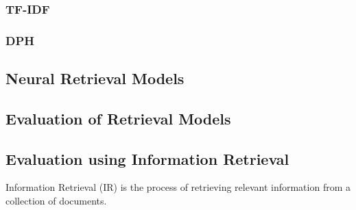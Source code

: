 \subsubsection{TF-IDF}\label{tf-idf}

\subsubsection{DPH}\label{dph}

\subsection{Neural Retrieval Models}\label{neural-retrieval-models}

\subsection{Evaluation of Retrieval Models}\label{evaluation-of-retrieval-models}


\subsection{Evaluation using Information Retrieval}\label{history-of-evaluation-using-information-retrieval}
Information Retrieval (IR) is the process of retrieving relevant information from a collection of documents.